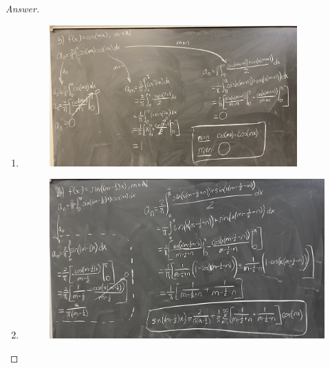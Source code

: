 \documentclass{article}
\theoremstyle{definition}
\renewcommand\qedsymbol{$\blacksquare$}
\newenvironment{ans}{\begin{proof}[Answer]\renewcommand{\qedsymbol}{}}{\end{proof}}
\begin{document}
\begin{ans}
\begin{enumerate}
        \item \phantom{.} \begin{figure}[H]
            \centering
            \includegraphics[width = 0.9\textwidth]{Problem 5-5.jpg}
        \end{figure}
\newpage
        \item \phantom{.} \begin{figure}[H]
            \centering
            \includegraphics[width = \textwidth]{Problem 5-6.jpg}
        \end{figure}
    \end{enumerate}
\end{ans}
\end{document}
